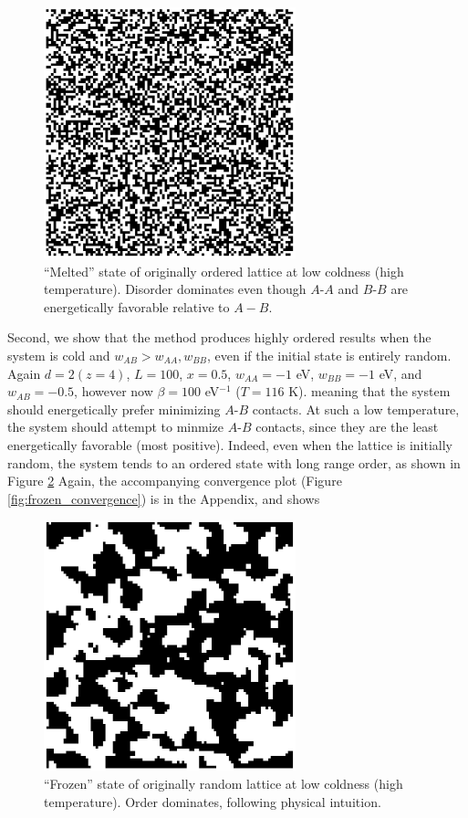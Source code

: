 \documentclass[10pt]{article}
\begin{document}
\begin{figure}[h!]
\centering
\includegraphics[width=0.65\textwidth]{Figures/verification_melted_lattice.png}
\caption{``Melted'' state of originally ordered lattice at low coldness (high temperature).
Disorder dominates even though $A$-$A$ and $B$-$B$ are energetically favorable relative to $A-B$.}
\label{fig:melted_lattice}
\end{figure}

Second, we show that the method produces highly ordered results when the system is cold and $w_{AB} > w_{AA},w_{BB}$, even if the initial state is entirely random.
Again $d=2 (z=4)$, $L=100$, $x=0.5$,  $w_{AA}=-1$ eV, $w_{BB} = -1$ eV, and $w_{AB} = -0.5$, however now $\beta = 100$ eV$^{-1}$ ($T=116$ K). meaning that the system should energetically prefer minimizing $A$-$B$ contacts.
At such a low temperature, the system should attempt to minmize $A$-$B$ contacts, since they are the least energetically favorable (most positive).
Indeed, even when the lattice is initially random, the system tends to an ordered state with long range order, as shown in Figure \ref{fig:frozen_lattice}
Again, the accompanying convergence plot (Figure \ref{fig:frozen_convergence}) is in the Appendix, and shows 

\begin{figure}[h!]
\centering
\includegraphics[width=0.65\textwidth]{Figures/verification_frozen_lattice.png}
\caption{``Frozen'' state of originally random lattice at low coldness (high temperature).
Order dominates, following physical intuition.}
\label{fig:frozen_lattice}
\end{figure}
\end{document}
